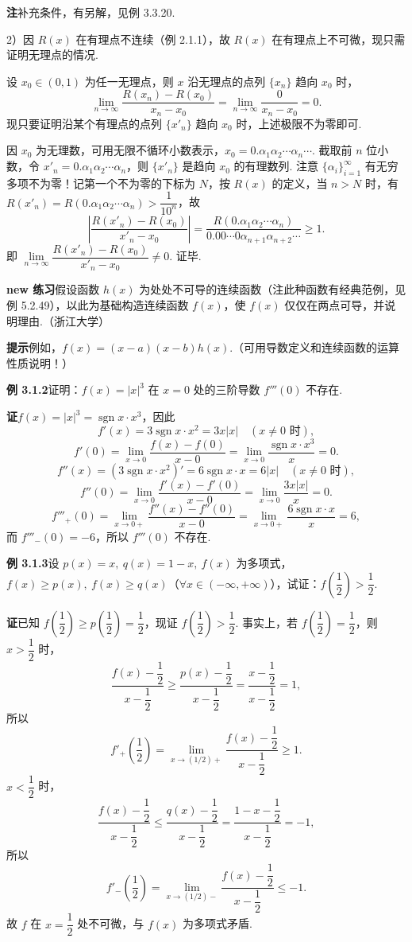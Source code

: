 \documentclass[UTF8, 12pt, fontset=fandol, oneside]{ctexart}
\begin{document}
\noindent\textbf{注}\quad 补充条件，有另解，见例 3.3.20.

2）因 $R(x)$ 在有理点不连续（例 2.1.1），故 $R(x)$ 在有理点上不可微，现只需证明无理点的情况.

设 $x_0\in(0,1)$ 为任一无理点，则 $x$ 沿无理点的点列 $\{x_n\}$ 趋向 $x_0$ 时，
\[
  \lim_{n\to\infty}\frac{R(x_n)-R(x_0)}{x_n-x_0}
  =\lim_{n\to\infty}\frac0{x_n-x_0}=0.
\]
现只要证明沿某个有理点的点列 $\{x'_n\}$ 趋向 $x_0$ 时，上述极限不为零即可.

因 $x_0$ 为无理数，可用无限不循环小数表示，$x_0=0.\alpha_1\alpha_2\cdots\alpha_n\cdots$. 截取前 $n$ 位小数，令 $x'_n=0.\alpha_1\alpha_2\cdots\alpha_n$，则 $\{x'_n\}$ 是趋向 $x_0$ 的有理数列. 注意 $\{\alpha_i\}_{i=1}^\infty$ 有无穷多项不为零！记第一个不为零的下标为 $N$，按 $R(x)$ 的定义，当 $n>N$ 时，有 $R(x'_n)=R(0.\alpha_1\alpha_2\cdots\alpha_n)>\dfrac1{10^n}$，故
\[
  \left|\frac{R(x'_n)-R(x_0)}{x'_n-x_0}\right|
  =\frac{R(0.\alpha_1\alpha_2\cdots\alpha_n)}
  {0.00\cdots0\alpha_{n+1}\alpha_{n+2}\cdots}\ge1.
\]
即 $\lim\limits_{n\to\infty}\dfrac{R(x'_n)-R(x_0)}{x'_n-x_0}\ne0$. 证毕.

\noindent\textbf{new 练习}\quad 假设函数 $h(x)$ 为处处不可导的连续函数（注\quad 此种函数有经典范例，见例 5.2.49），以此为基础构造连续函数 $f(x)$，使 $f(x)$ 仅仅在两点可导，并说明理由.（浙江大学）

\noindent\textbf{提示}\quad 例如，$f(x)=(x-a)(x-b)h(x)$.（可用导数定义和连续函数的运算性质说明！）

\noindent\textbf{例 3.1.2}\quad 证明：$f(x)=|x|^3$ 在 $x=0$ 处的三阶导数 $f'''(0)$ 不存在.

\noindent\textbf{证}\quad $f(x)=|x|^3=\operatorname{sgn}x\cdot x^3$，因此
\[
  f'(x)=3\operatorname{sgn}x\cdot x^2=3x|x|\quad(x\ne0\text{ 时}),
\]
\[
  f'(0)=\lim_{x\to0}\frac{f(x)-f(0)}{x-0}
  =\lim_{x\to0}\frac{\operatorname{sgn}x\cdot x^3}{x}=0.
\]
\[
  f''(x)=(3\operatorname{sgn}x\cdot x^2)'=6\operatorname{sgn}x\cdot x=6|x|\quad(x\ne0\text{ 时}),
\]
\[
  f''(0)=\lim_{x\to0}\frac{f'(x)-f'(0)}{x-0}
  =\lim_{x\to0}\frac{3x|x|}{x}=0.
\]
\[
  f'''_+(0)=\lim_{x\to0+}\frac{f''(x)-f''(0)}{x-0}
  =\lim_{x\to0+}\frac{6\operatorname{sgn}x\cdot x}{x}=6,
\]
而 $f'''_-(0)=-6$，所以 $f'''(0)$ 不存在.

\noindent\textbf{例 3.1.3}\quad 设 $p(x)=x,\ q(x)=1-x,\ f(x)$ 为多项式，$f(x)\ge p(x),\ f(x)\ge q(x)$（$\forall x\in(-\infty,+\infty)$），试证：$f\left(\dfrac12\right)>\dfrac12$.

\noindent\textbf{证}\quad 已知 $f\left(\dfrac12\right)\ge p\left(\dfrac12\right)=\dfrac12$，现证 $f\left(\dfrac12\right)>\dfrac12$. 事实上，若 $f\left(\dfrac12\right)=\dfrac12$，则 $x>\dfrac12$ 时，
\[
  \frac{f(x)-\dfrac12}{x-\dfrac12}
  \ge\frac{p(x)-\dfrac12}{x-\dfrac12}
  =\frac{x-\dfrac12}{x-\dfrac12}=1,
\]
所以
\[
  f'_+\left(\frac12\right)
  =\lim_{x\to(1/2)+}\frac{f(x)-\dfrac12}{x-\dfrac12}\ge1.
\]
$x<\dfrac12$ 时，
\[
  \frac{f(x)-\dfrac12}{x-\dfrac12}
  \le\frac{q(x)-\dfrac12}{x-\dfrac12}
  =\frac{1-x-\dfrac12}{x-\dfrac12}=-1,
\]
所以
\[
  f'_-\left(\frac12\right)
  =\lim_{x\to(1/2)-}\frac{f(x)-\dfrac12}{x-\dfrac12}\le-1.
\]
故 $f$ 在 $x=\dfrac12$ 处不可微，与 $f(x)$ 为多项式矛盾.
\end{document}
